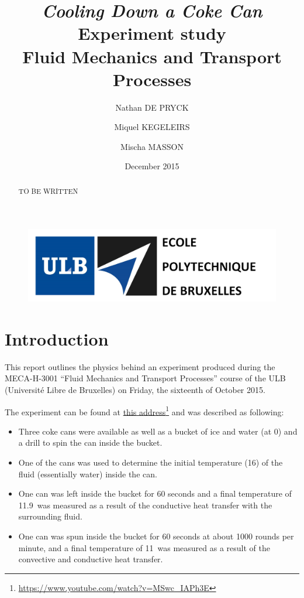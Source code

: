 \documentclass{report}
\title{\Huge\emph{Cooling Down a Coke Can}\\
	\LARGE Experiment study\\
	\vspace{11pt}
	\large Fluid Mechanics and Transport Processes}
\date{December 2015}
\author{Nathan DE PRYCK \and Miquel KEGELEIRS \and Mischa MASSON}
\begin{document}
	
	\begin{figure}[t]
		\includegraphics[width=15cm]{img/entete.PNG}
	\end{figure}
	
	\maketitle
	
	\renewcommand{\abstractname}{``Cooling down a coke can'' \\Experiment study by Nathan De Pryck, Miquel Kegeleirs and Mischa Masson\\ Université Libre de Bruxelles\\2015-2016.}
	
	\BgThispage
	
	\begin{abstract}
		TO BE WRITTEN
	\end{abstract}
	
	\clearpage
	
	\tableofcontents
	
	\chapter{Introduction}\label{intro}
	
	This report outlines the physics behind an experiment produced during the MECA-H-3001 ``Fluid Mechanics and Transport Processes'' course of the ULB (Université Libre de Bruxelles) on Friday, the sixteenth of October 2015.
	
	The experiment can be found at \hyperref{https://www.youtube.com/watch?v=MSwc_IAPh3E}{}{}{this address}\footnote{\url{https://www.youtube.com/watch?v=MSwc_IAPh3E}} and was described as following:
	
	\begin{itemize}
		\item Three coke cans were available as well as a bucket of ice and water (at 0\textcelsius) and a drill to spin the can inside the bucket.
		\item One of the cans was used to determine the initial temperature (16\textcelsius) of the fluid (essentially water) inside the can.
		\item One can was left inside the bucket for 60 seconds and a final temperature of 11.9\textcelsius \ was measured as a result of the conductive heat transfer with the surrounding fluid.
		\item One can was spun inside the bucket for 60 seconds at about 1000 rounds per minute, and a final temperature of 11\textcelsius \ was measured as a result of the convective and conductive heat transfer.
	\end{itemize}
	
\end{document}
